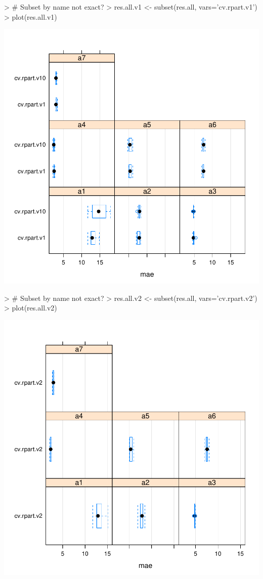 \documentclass{article}
\begin{document}
\begin{Schunk}
\begin{Sinput}
> # Subset by name not exact?
> res.all.v1 <- subset(res.all, vars='cv.rpart.v1')
> plot(res.all.v1)
\end{Sinput}
\end{Schunk}
\includegraphics{Assignment2-009}

\begin{Schunk}
\begin{Sinput}
> # Subset by name not exact?
> res.all.v2 <- subset(res.all, vars='cv.rpart.v2')
> plot(res.all.v2)
\end{Sinput}
\end{Schunk}
\includegraphics{Assignment2-010}
\end{document}
